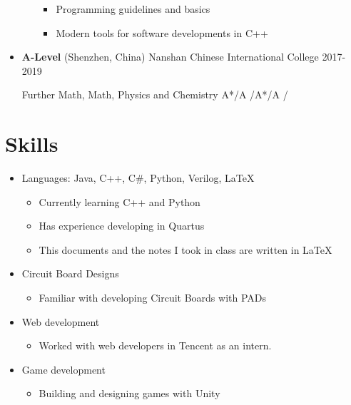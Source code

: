 \begin{itemize}
\begin{itemize}
        \begin{itemize}
          \item Programming guidelines and basics
          \item Modern tools for software developments in C++
        \end{itemize}
      \end{itemize}

    \item \textbf{A-Level} \dashdiv{} (Shenzhen, China) Nanshan Chinese International College \dashdiv{} 2017-2019

      Further Math, Math, Physics and Chemistry \dashdiv{} A*/A /A*/A /
  \end{itemize}

  \section{Skills}

  \begin{itemize}[itemsep=0.1\parskip]
    \item Languages: Java, C++, C\#, Python, Verilog, \LaTeX

    \begin{itemize}
      \item Currently learning C++ and Python
      \item Has experience developing in Quartus
      \item This documents and the notes I took in class are written in \LaTeX
    \end{itemize}

    \item Circuit Board Designs
    \begin{itemize}
      \item Familiar with developing Circuit Boards with PADs
    \end{itemize}

    \item Web development
    \begin{itemize}
      \item Worked with web developers in Tencent as an intern.
    \end{itemize}
    
    \item Game development
    \begin{itemize}
      \item Building and designing games with Unity
    \end{itemize}

  \end{itemize}

